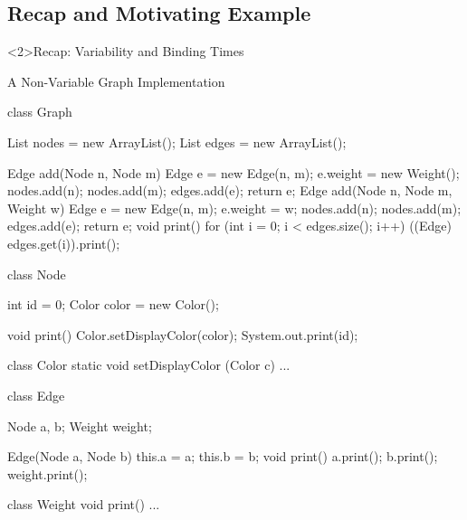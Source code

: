 


\subsection{Recap and Motivating Example}

\begin{frame}<2>{Recap: Variability and Binding Times}
	\frameVariabilityAndBindingTimes
\end{frame}

\begin{frame}[fragile]{A Non-Variable Graph Implementation}
	\small
	\begin{fancycolumns}[t,columns=3,widths={43,30,32}]
\begin{codetight}{}
class Graph {
	List nodes = new ArrayList();
	List edges = new ArrayList();

	Edge add(Node n, Node m) {
		Edge e = new Edge(n, m);
		e.weight = new Weight();
		nodes.add(n); nodes.add(m); edges.add(e);
		return e;
	}
	Edge add(Node n, Node m, Weight w) {
		Edge e = new Edge(n, m);
		e.weight = w;
		nodes.add(n); nodes.add(m); edges.add(e);
		return e;
	}
	void print() {
		for (int i = 0; i < edges.size(); i++) {
			((Edge) edges.get(i)).print();
		}
	}
}
\end{codetight}
	\nextcolumn
\begin{codetight}{}
class Node {
	int id = 0;
	Color color = new Color();

	void print() {
		Color.setDisplayColor(color);
		System.out.print(id);
	}
}
\end{codetight}
\begin{codetight}{}
class Color {
	static void setDisplayColor
		(Color c) {...}
}
\end{codetight}
	\nextcolumn
\begin{codetight}{}
class Edge {
	Node a, b;
	Weight weight;

	Edge(Node a, Node b) {
		this.a = a; this.b = b;
	}
	void print() {
		a.print(); b.print();
		weight.print();
	}
}
\end{codetight}
\begin{codetight}{}
class Weight {
	void print() {...}
}
\end{codetight}
	\end{fancycolumns}
\end{frame}

